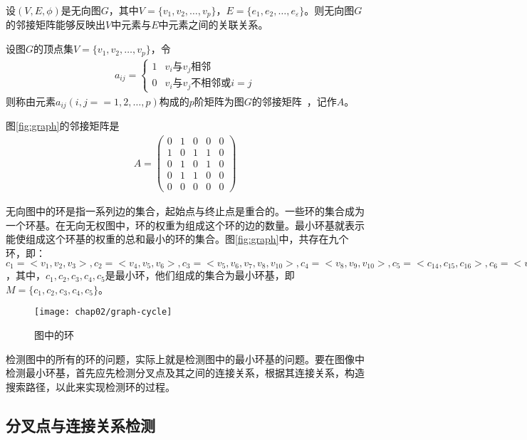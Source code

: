 设$(V, E, \phi)$是无向图$G$，其中$V = \{v_1, v_2, \ldots, v_p\}$，$E = \{e_1, e_2, \ldots, e_\varepsilon\}$。则无向图$G$的邻接矩阵能够反映出$V$中元素与$E$中元素之间的关联关系。
\begin{definition}
设图$G$的顶点集$V = \{v_1, v_2, \ldots, v_p\}$，令
\begin{align}
a_{ij} = \left\{ \begin{array}{ll}
1 & \textrm{$v_i$与$v_j$相邻}\\
0 & \textrm{$v_i$与$v_j$不相邻或$i = j$}
\end{array} \right.
\end{align}
则称由元素$a_{ij} (i, j == 1, 2, \ldots, p)$构成的$p$阶矩阵为图$G$的邻接矩阵~\cite{wangzhaorui}，记作$A$。
\end{definition}
图\ref{fig:graph}的邻接矩阵是
\begin{align}
A = \left( \begin{array}{lllll}
0 & 1 & 0 & 0 & 0 \\
1 & 0 & 1 & 1 & 0 \\
0 & 1 & 0 & 1 & 0 \\
0 & 1 & 1 & 0 & 0 \\
0 & 0 & 0 & 0 & 0 
\end{array} \right)
\end{align}

无向图中的环是指一系列边的集合，起始点与终止点是重合的。一些环的集合成为一个环基。在无向无权图中，环的权重为组成这个环的边的数量。最小环基就表示能使组成这个环基的权重的总和最小的环的集合。图\ref{fig:graph}中，共存在九个环，即：$c_1 = < v_1, v_2, v_3>, c_2 = <v_4, v_5, v_6>, c_3 = <v_5, v_6, v_7, v_8, v_{10}>, c_4 = <v_8, v_9, v_{10}>, c_5 = < c_{14}, c_{15}, c_{16}>, c_6 = <v_{10}, v_{11}, v_{12}, v_{13}>, c_7 = <c_4, c_5, v_{10}, v_9, v_8, v_7, v_6>, c_8 = < v_6, v_5, v_{10}, v_9, v_8, v_7>, v_9 = < v_4, v_5, v_{10}, v_9, v_8, v_7, v_6>$，其中，$c_1, c_2, c_3, c_4, c_5$是最小环，他们组成的集合为最小环基，即$M = \{c_1, c_2, c_3, c_4, c_5\}$。
\begin{figure}[H]
\centering
    \centering
    \texttt{[image: chap02/graph-cycle]}\medskip
\caption{图中的环}
\label{fig:graph-cycle}
\end{figure}


检测图中的所有的环的问题，实际上就是检测图中的最小环基的问题。要在图像中检测最小环基，首先应先检测分叉点及其之间的连接关系，根据其连接关系，构造搜索路径，以此来实现检测环的过程。

\subsection{分叉点与连接关系检测}
\label{}

